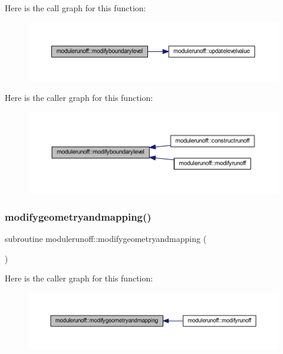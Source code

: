 Here is the call graph for this function\+:\nopagebreak
\begin{figure}[H]
\begin{center}
\leavevmode
\includegraphics[width=350pt]{namespacemodulerunoff_aac03c1526e1f45dcfe31d200ac141d7e_cgraph}
\end{center}
\end{figure}
Here is the caller graph for this function\+:\nopagebreak
\begin{figure}[H]
\begin{center}
\leavevmode
\includegraphics[width=350pt]{namespacemodulerunoff_aac03c1526e1f45dcfe31d200ac141d7e_icgraph}
\end{center}
\end{figure}
\mbox{\label{namespacemodulerunoff_a5ae3563ef43601cbe338d999deca7e2b}} 
\subsubsection{\texorpdfstring{modifygeometryandmapping()}{modifygeometryandmapping()}}
{\footnotesize\ttfamily subroutine modulerunoff\+::modifygeometryandmapping (\begin{DoxyParamCaption}{ }\end{DoxyParamCaption})\hspace{0.3cm}{\ttfamily [private]}}

Here is the caller graph for this function\+:\nopagebreak
\begin{figure}[H]
\begin{center}
\leavevmode
\includegraphics[width=350pt]{namespacemodulerunoff_a5ae3563ef43601cbe338d999deca7e2b_icgraph}
\end{center}
\end{figure}
\mbox{\label{namespacemodulerunoff_a43ce9e041625ab643d74cc279ddf43db}} 
